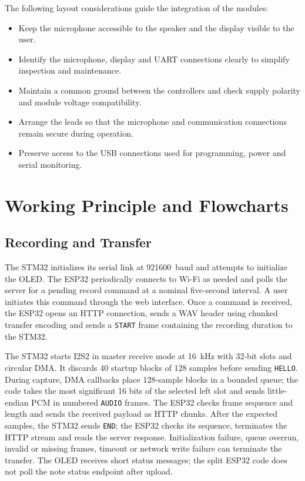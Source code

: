 \documentclass[a4paper,12pt,oneside]{report}
\begin{document}
The following layout considerations guide the integration of the modules:
\begin{itemize}
\item Keep the microphone accessible to the speaker and the display visible to the user.
\item Identify the microphone, display and UART connections clearly to simplify inspection and maintenance.
\item Maintain a common ground between the controllers and check supply polarity and module voltage compatibility.
\item Arrange the leads so that the microphone and communication connections remain secure during operation.
\item Preserve access to the USB connections used for programming, power and serial monitoring.
\end{itemize}

\section{Working Principle and Flowcharts}
\label{sec:working}
\subsection{Recording and Transfer}
The STM32 initializes its serial link at 921600~baud and attempts to initialize the OLED. The ESP32 periodically connects to Wi-Fi as needed and polls the server for a pending record command at a nominal five-second interval. A user initiates this command through the web interface. Once a command is received, the ESP32 opens an HTTP connection, sends a WAV header using chunked transfer encoding and sends a \texttt{START} frame containing the recording duration to the STM32.

The STM32 starts I2S2 in master receive mode at 16~kHz with 32-bit slots and circular DMA. It discards 40 startup blocks of 128 samples before sending \texttt{HELLO}. During capture, DMA callbacks place 128-sample blocks in a bounded queue; the code takes the most significant 16 bits of the selected left slot and sends little-endian PCM in numbered \texttt{AUDIO} frames. The ESP32 checks frame sequence and length and sends the received payload as HTTP chunks. After the expected samples, the STM32 sends \texttt{END}; the ESP32 checks its sequence, terminates the HTTP stream and reads the server response. Initialization failure, queue overrun, invalid or missing frames, timeout or network write failure can terminate the transfer. The OLED receives short status messages; the split ESP32 code does not poll the note status endpoint after upload.
\end{document}
